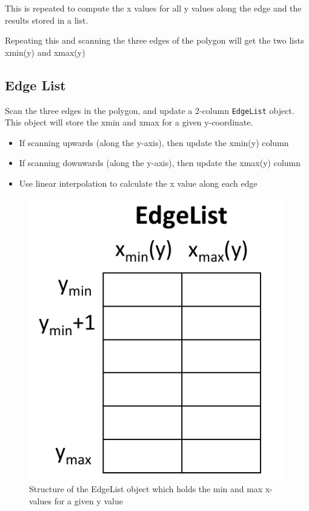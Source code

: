 \documentclass[
]{book}
\providecommand{\tightlist}{%
  \setlength{\itemsep}{0pt}\setlength{\parskip}{0pt}}
\begin{document}
This is repeated to compute the x values for all y values along the edge and the results stored in a list.

Repeating this and scanning the three edges of the polygon will get the two lists xmin(y) and xmax(y)

\hypertarget{edge-list}{%
\subsection{Edge List}\label{edge-list}}

Scan the three edges in the polygon, and update a 2-column \texttt{EdgeList} object. This object will store the xmin and xmax for a given y-coordinate.

\begin{itemize}
\tightlist
\item
  If scanning upwards (along the y-axis), then update the xmin(y) column
\item
  If scanning downwards (along the y-axis), then update the xmax(y) column
\item
  Use linear interpolation to calculate the x value along each edge
\end{itemize}

\begin{figure}
\centering
\includegraphics{img/08-image34.png}
\caption{\label{fig:edgelist}Structure of the EdgeList object which holds the min and max x-values for a given y value}
\end{figure}
\end{document}
